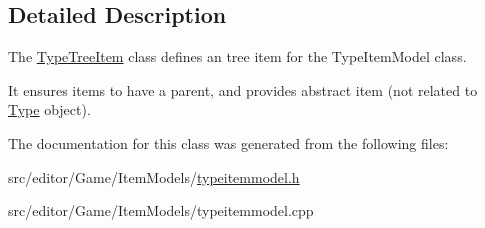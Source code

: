 \subsection{\-Detailed \-Description}
\-The \hyperlink{class_type_tree_item}{\-Type\-Tree\-Item} class defines an tree item for the \-Type\-Item\-Model class. 

\-It ensures items to have a parent, and provides abstract item (not related to \hyperlink{class_type}{\-Type} object). 

\-The documentation for this class was generated from the following files\-:\begin{DoxyCompactItemize}
\item 
src/editor/\-Game/\-Item\-Models/\hyperlink{typeitemmodel_8h}{typeitemmodel.\-h}\item 
src/editor/\-Game/\-Item\-Models/typeitemmodel.\-cpp\end{DoxyCompactItemize}
